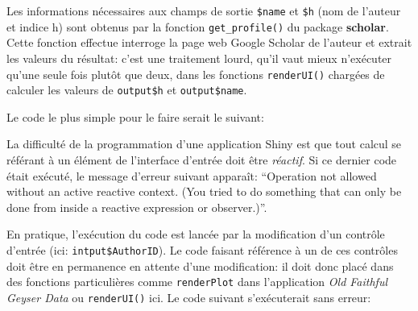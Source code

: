\documentclass[
  12pt,
  french,
  a4paper,
  extrafontsizes,onecolumn,openright
  ]{memoir}
\newenvironment{Shaded}{\begin{snugshade}}{\end{snugshade}}
\newcommand{\CommentTok}[1]{\textcolor[rgb]{0.56,0.35,0.01}{\textit{#1}}}
\newcommand{\KeywordTok}[1]{\textcolor[rgb]{0.13,0.29,0.53}{\textbf{#1}}}
\newcommand{\NormalTok}[1]{#1}
\newcommand{\OperatorTok}[1]{\textcolor[rgb]{0.81,0.36,0.00}{\textbf{#1}}}
\newcommand{\StringTok}[1]{\textcolor[rgb]{0.31,0.60,0.02}{#1}}
\newlength{\rf}
\begin{document}
\begin{Shaded}
\begin{Highlighting}[]
{\NormalTok{  output}\OperatorTok{$}\NormalTok{network <-}\StringTok{ }\KeywordTok{renderPlot}\NormalTok{(\{}
    \KeywordTok{ggplot}\NormalTok{() }\OperatorTok{+}\StringTok{ }\KeywordTok{geom_blank}\NormalTok{()}
\NormalTok{  \})}
\NormalTok{\}}
\end{Highlighting}
\end{Shaded}

\normalsize

Les informations nécessaires aux champs de sortie \texttt{\$name} et \texttt{\$h} (nom de l'auteur et indice h) sont obtenus par la fonction \texttt{get\_profile()} du package \textbf{scholar}.
Cette fonction effectue interroge la page web Google Scholar de l'auteur et extrait les valeurs du résultat: c'est une traitement lourd, qu'il vaut mieux n'exécuter qu'une seule fois plutôt que deux, dans les fonctions \texttt{renderUI()} chargées de calculer les valeurs de \texttt{output\$h} et \texttt{output\$name}.

Le code le plus simple pour le faire serait le suivant:

\scriptsize

\begin{Shaded}
\end{Shaded}

\normalsize

La difficulté de la programmation d'une application Shiny est que tout calcul se référant à un élément de l'interface d'entrée doit être \emph{réactif}.
Si ce dernier code était exécuté, le message d'erreur suivant apparaît:
\enquote{Operation not allowed without an active reactive context. (You tried to do something that can only be done from inside a reactive expression or observer.)}.

En pratique, l'exécution du code est lancée par la modification d'un contrôle d'entrée (ici: \texttt{intput\$AuthorID}).
Le code faisant référence à un de ces contrôles doit être en permanence en attente d'une modification: il doit donc placé dans des fonctions particulières comme \texttt{renderPlot} dans l'application \emph{Old Faithful Geyser Data} ou \texttt{renderUI()} ici.
Le code suivant s'exécuterait sans erreur:

\scriptsize
\end{document}
